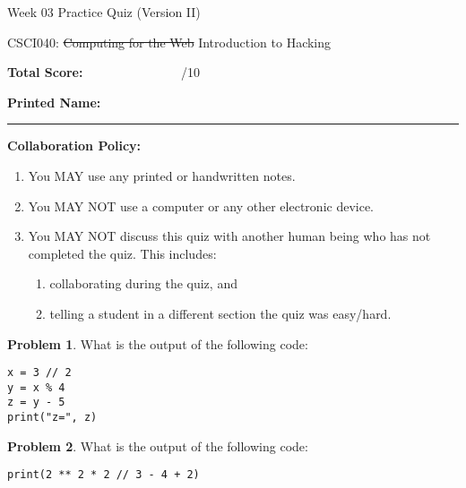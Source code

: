 \documentclass[10pt]{article}
\theoremstyle{definition}
\newtheorem{problem}{Problem}
\begin{document}
\begin{center}
    {
\Large
    Week 03 Practice Quiz (Version II)
}

    \vspace{0.1in}
    CSCI040: \sout{Computing for the Web} Introduction to Hacking

    \vspace{0.1in}
\end{center}

\vspace{0.15in}
\noindent
\textbf{Total Score:} ~~~~~~~~~~~~~~~/10

\vspace{0.5in}
\noindent
\textbf{Printed Name:}

\noindent
\rule{\textwidth}{0.1pt}
\vspace{0.25in}

\noindent
\textbf{Collaboration Policy:}
\begin{enumerate}
    \item You MAY use any printed or handwritten notes.
    \item You MAY NOT use a computer or any other electronic device.
    \item You MAY NOT discuss this quiz with another human being who has not completed the quiz.
        This includes:
        \begin{enumerate}
            \item collaborating during the quiz, and
            \item telling a student in a different section the quiz was easy/hard.
        \end{enumerate}
\end{enumerate}

\vspace{0.15in}

\begin{problem}
    What is the output of the following code:
\end{problem}
\begin{lstlisting}
x = 3 // 2
y = x % 4
z = y - 5
print("z=", z)
\end{lstlisting}
\vspace{1.5in}

\begin{problem}
    What is the output of the following code:
\end{problem}
\begin{lstlisting}
print(2 ** 2 * 2 // 3 - 4 + 2)
\end{lstlisting}
\vspace{1.5in}
\end{document}
